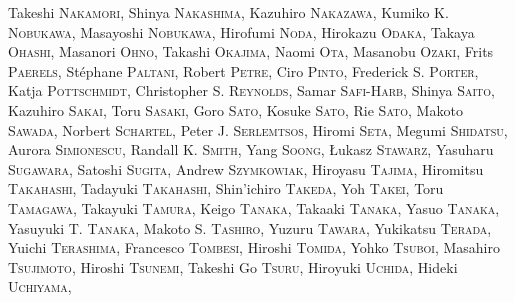 {Takeshi \textsc{Nakamori},
Shinya \textsc{Nakashima},
Kazuhiro \textsc{Nakazawa},
Kumiko K. \textsc{Nobukawa},
Masayoshi \textsc{Nobukawa},
Hirofumi \textsc{Noda},
Hirokazu \textsc{Odaka},
Takaya \textsc{Ohashi},
Masanori \textsc{Ohno},
Takashi \textsc{Okajima},
Naomi \textsc{Ota},
Masanobu \textsc{Ozaki},
Frits \textsc{Paerels},
St\'ephane \textsc{Paltani},
Robert \textsc{Petre},
Ciro \textsc{Pinto},
Frederick S. \textsc{Porter},
Katja \textsc{Pottschmidt},
Christopher S. \textsc{Reynolds},
Samar \textsc{Safi-Harb},
Shinya \textsc{Saito},
Kazuhiro \textsc{Sakai},
Toru \textsc{Sasaki},
Goro \textsc{Sato},
Kosuke \textsc{Sato},
Rie \textsc{Sato},
Makoto \textsc{Sawada},
Norbert \textsc{Schartel},
Peter J. \textsc{Serlemtsos},
Hiromi \textsc{Seta},
Megumi \textsc{Shidatsu},
Aurora \textsc{Simionescu},
Randall K. \textsc{Smith},
Yang \textsc{Soong},
{\L}ukasz \textsc{Stawarz},
Yasuharu \textsc{Sugawara},
Satoshi \textsc{Sugita},
Andrew \textsc{Szymkowiak},
Hiroyasu \textsc{Tajima},
Hiromitsu \textsc{Takahashi},
Tadayuki \textsc{Takahashi},
Shin'ichiro \textsc{Takeda},
Yoh \textsc{Takei},
Toru \textsc{Tamagawa},
Takayuki \textsc{Tamura},
Keigo \textsc{Tanaka},
Takaaki \textsc{Tanaka},
Yasuo \textsc{Tanaka},
Yasuyuki T. \textsc{Tanaka},
Makoto S. \textsc{Tashiro},
Yuzuru \textsc{Tawara},
Yukikatsu \textsc{Terada},
Yuichi \textsc{Terashima},
Francesco \textsc{Tombesi},
Hiroshi \textsc{Tomida},
Yohko \textsc{Tsuboi},
Masahiro \textsc{Tsujimoto},
Hiroshi \textsc{Tsunemi},
Takeshi Go \textsc{Tsuru},
Hiroyuki \textsc{Uchida},
Hideki \textsc{Uchiyama},
}
